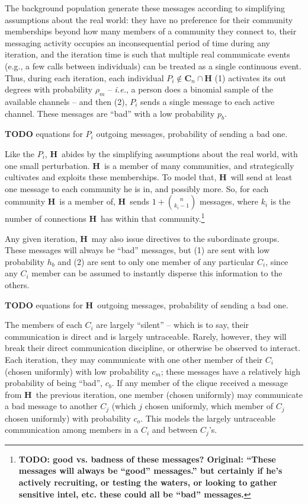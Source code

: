 \documentclass{article}
\newcommand{\Hub}[0]{\ensuremath{\mathbf{H}}}
\newcommand{\C}[1]{\ensuremath{\mathbf{C}_{#1}}}
\begin{document}
The background population generate these messages according to simplifying assumptions about the real world: they have no preference for their community memberships beyond how many members of a community they connect to, their messaging activity occupies an inconsequential period of time during any iteration, and the iteration time is such that multiple real communicate events (e.g., a few calls between individuals) can be treated as a single continuous event.  Thus, during each iteration, each individual $P_i\notin\C{n}\cap\Hub$ (1) activates its out degrees with probability $\rho_m$ -- {\em i.e.}, a person does a binomial sample of the available channels -- and then (2), $P_i$ sends a single message to each active channel.  These messages are ``bad'' with a low probability $p_b$.

{\bf TODO} equations for $P_i$ outgoing messages, probability of sending a bad one.

Like the $P_i$, \Hub\ abides by the simplifying assumptions about the real world, with one small perturbation.  \Hub\ is a member of many communities, and strategically cultivates and exploits these memberships.  To model that, \Hub\ will send at least one message to each community he is in, and possibly more.  So, for each community \Hub\ is a member of, \Hub\ sends $1+{n\choose k_i-1}$ messages, where $k_i$ is the number of connections \Hub\ has within that community.\footnote{{\bf TODO: good vs. badness of these messages? Original: ``These messages will always be ``good'' messages.'' but certainly if he's actively recruiting, or testing the waters, or looking to gather sensitive intel, etc. these could all be ``bad'' messages.}}

Any given iteration, \Hub\ may also issue directives to the subordinate groups.  These messages will always be ``bad'' messages, but (1) are sent with low probability $h_b$ and (2) are sent to only one member of any particular $C_i$, since any $C_i$ member can be assumed to instantly disperse this information to the others.

{\bf TODO} equations for \Hub\ outgoing messages, probability of sending a bad one.

The members of each $C_i$ are largely ``silent'' -- which is to say, their communication is direct and is largely untraceable.  Rarely, however, they will break their direct communication discipline, or otherwise be observed to interact.  Each iteration, they may communicate with one other member of their $C_i$ (chosen uniformly) with low probability $c_m$; these messages have a relatively high probability of being ``bad'', $c_b$.  If any member of the clique received a message from \Hub\ the previous iteration, one member (chosen uniformly) may communicate a bad message to another $C_j$ (which $j$ chosen uniformly, which member of $C_j$ chosen uniformly) with probability $c_o$.  This models the largely untraceable communication among members in a $C_i$ and between $C_j$'s.
\end{document}
